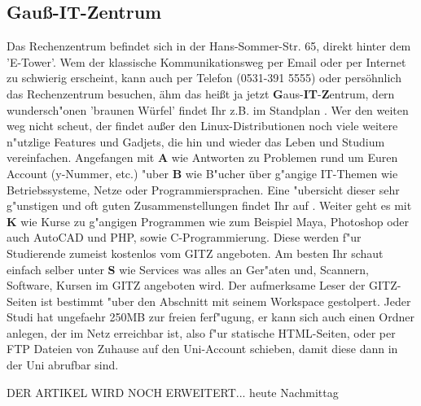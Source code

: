 \subsection{Gauß-IT-Zentrum}

Das Rechenzentrum befindet sich in der Hans-Sommer-Str. 65, direkt hinter dem 'E-Tower'.
Wem der klassische Kommunikationsweg per Email  oder per Internet  zu schwierig erscheint, kann auch per Telefon (0531-391 5555) oder persöhnlich das Rechenzentrum besuchen, ähm das heißt ja jetzt \textbf{G}aus-\textbf{IT}-\textbf{Z}entrum, dern wundersch"onen 'braunen Würfel' findet Ihr z.B. im Standplan . Wer den weiten weg nicht scheut, der findet außer den Linux-Distributionen noch viele weitere n"utzlige Features und Gadjets, die hin und wieder das Leben und Studium vereinfachen. Angefangen mit \textbf{A} wie Antworten zu Problemen rund um Euren Account (y-Nummer, etc.) "uber  \textbf{B} wie B"ucher über g"angige IT-Themen wie Betriebssysteme, Netze oder Programmiersprachen. Eine "ubersicht dieser sehr g"unstigen und oft guten Zusammenstellungen findet Ihr auf . Weiter geht es mit \textbf{K} wie Kurse  zu g"angigen Programmen wie zum Beispiel Maya, Photoshop oder auch AutoCAD und PHP, sowie C-Programmierung. Diese werden f"ur Studierende zumeist kostenlos vom GITZ angeboten. Am besten Ihr schaut einfach selber unter \textbf{S} wie Services  was alles an Ger"aten und, Scannern, Software, Kursen im GITZ angeboten wird. Der aufmerksame Leser der GITZ-Seiten ist bestimmt "uber den Abschnitt mit seinem Workspace gestolpert. Jeder Studi hat ungefaehr 250MB zur freien ferf"ugung, er kann sich auch einen Ordner anlegen, der im Netz erreichbar ist, also f"ur statische HTML-Seiten, oder per FTP Dateien von Zuhause auf den Uni-Account schieben, damit diese dann in der Uni abrufbar sind.\newline

DER ARTIKEL WIRD NOCH ERWEITERT... heute Nachmittag  
